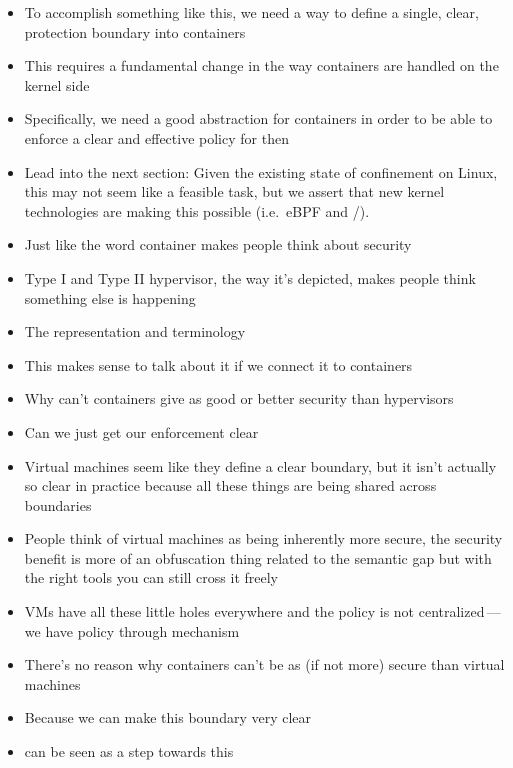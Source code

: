 \begin{inprogress}
  \begin{itemize}
    \item To accomplish something like this, we need a way to define a single, clear,
          protection boundary into containers
    \item This requires a fundamental change in the way containers are handled on the kernel side
    \item Specifically, we need a good abstraction for containers in order to be able to enforce
          a clear and effective policy for then
    \item Lead into the next section: Given the existing state of confinement on Linux,
          this may not seem like a feasible task, but we assert that new kernel technologies
          are making this possible (i.e.~eBPF and \bpfbox{}/\bpfcontain{}).
  \end{itemize}
\end{inprogress}

\begin{inprogress}
  \begin{itemize}
    \item Just like the word container makes people think about security
    \item Type I and Type II hypervisor, the way it's depicted, makes people think something else is happening
    \item The representation and terminology
    \item This makes sense to talk about it if we connect it to containers
    \item Why can't containers give as good or better security than hypervisors
    \item Can we just get our enforcement clear
    \item Virtual machines seem like they define a clear boundary, but it isn't actually
          so clear in practice because all these things are being shared across boundaries
    \item People think of virtual machines as being inherently more secure, the security
          benefit is more of an obfuscation thing related to the semantic gap but with the right
          tools you can still cross it freely
    \item VMs have all these little holes everywhere and the policy is not centralized\,---\,we
          have policy through mechanism
    \item There's no reason why containers can't be as (if not more) secure than virtual machines
    \item Because we can make this boundary very clear
    \item \bpfcontain{} can be seen as a step towards this
  \end{itemize}
\end{inprogress}

